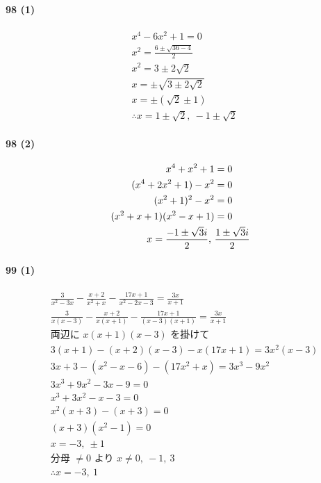 \documentclass[fleqn,a4j,dvipdfmx,uplatex,twocolumn]{jsarticle}
\def\nr{\notag\\}%
\begin{document}
\paragraph{98 (1)}
\begin{align*}
  &x^{4}-6x^{2}+1=0 \\
  &x^{2} = \frac{6 \pm \sqrt{36-4}}{2} \\
  &x^{2} = 3 \pm 2\sqrt{2} \\
  &x = \pm\sqrt{3 \pm 2\sqrt{2}} \\
  &x = \pm(\sqrt{2} \pm 1) \\
  &\therefore x = 1 \pm \sqrt{2}, \ -1 \pm \sqrt{2}
\end{align*}

\paragraph{98 (2)}
\begin{align*}
  x^4+x^2+1&=0 \nr
  (x^4+2x^2+1)-x^2&=0 \nr
  (x^2+1)^2-x^2&=0 \nr
  (x^2+x+1)(x^2-x+1)&=0 \nr
  x=\frac{-1\pm\sqrt{3}i}{2}, \ &\frac{1\pm\sqrt{3}i}{2}
\end{align*}

\paragraph{99 (1)}
\begin{align*}
  &\frac{3}{x^{2}-3x}-\frac{x+2}{x^{2}+x}-\frac{17x+1}{x^{2}-2x-3}=\frac{3x}{x+1} \\
  &\frac{3}{x(x-3)}-\frac{x+2}{x(x+1)}-\frac{17x+1}{(x-3)(x+1)}=\frac{3x}{x+1} \\
  &\text{両辺に } x(x+1)(x-3) \text{ を掛けて} \\
  &3(x+1)-(x+2)(x-3)-x(17x+1)=3x^{2}(x-3) \\
  &3x+3-(x^{2}-x-6)-(17x^{2}+x)=3x^{3}-9x^{2} \\
  &3x^{3}+9x^{2}-3x-9=0 \\
  &x^{3}+3x^{2}-x-3=0 \\
  &x^{2}(x+3)-(x+3)=0 \\
  &(x+3)(x^{2}-1)=0 \\
  &x=-3, \ \pm 1 \\
  &\text{分母 } \neq 0 \text{ より } x \neq 0, \ -1, \ 3 \\
  &\therefore x=-3, \ 1
\end{align*}
\end{document}
